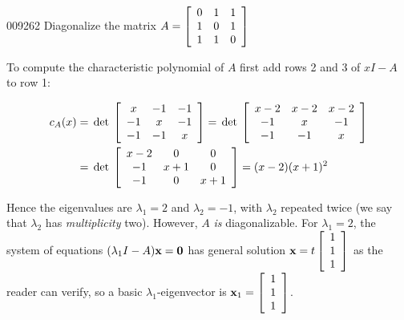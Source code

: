 \begin{example}{}{009262}
Diagonalize the matrix $ A = \left[ \begin{array}{rrr}
0 & 1 & 1 \\
1 & 0 & 1 \\
1 & 1 & 0 
\end{array}\right]$



\begin{solution}
  To compute the characteristic polynomial of $A$ first add rows 2 and 3 of $xI - A$ to row 1:


\begin{align*}
c_A(x) &= \thinspace\operatorname{det\medspace} \left[ \begin{array}{ccc}
x & -1 & -1 \\
-1 & x & -1\\
-1 & -1 & x
\end{array}\right] =  \thinspace\operatorname{det\medspace} \left[ \begin{array}{ccc}
x-2 & x-2 & x-2 \\
-1 & x & -1\\
-1 & -1 & x
\end{array}\right] \\
& =  \thinspace\operatorname{det\medspace} \left[ \begin{array}{ccc}
x-2 & 0 & 0 \\
-1 & x+1 & 0\\
-1 & 0 & x+1
\end{array}\right] = (x-2)(x+1)^2
\end{align*}

Hence the eigenvalues are $\lambda_{1} = 2$ and $\lambda_{2} = -1$, with $\lambda_{2}$ repeated twice (we say that $\lambda_{2}$ has \textit{multiplicity} two). However, $A$ \textit{is} diagonalizable. For $\lambda_{1} = 2$, the system of equations $(\lambda_{1}I - A)\textbf{x} = \textbf{0}$ has general solution $\textbf{x} = t \left[ \begin{array}{r}
1\\
1\\
1
\end{array}\right]$
 as the reader can verify, so a basic $\lambda_{1}$-eigenvector is $\textbf{x}_1 = \left[ \begin{array}{r}
1\\
1\\
1
\end{array}\right]$.



\end{solution}
\end{example}
